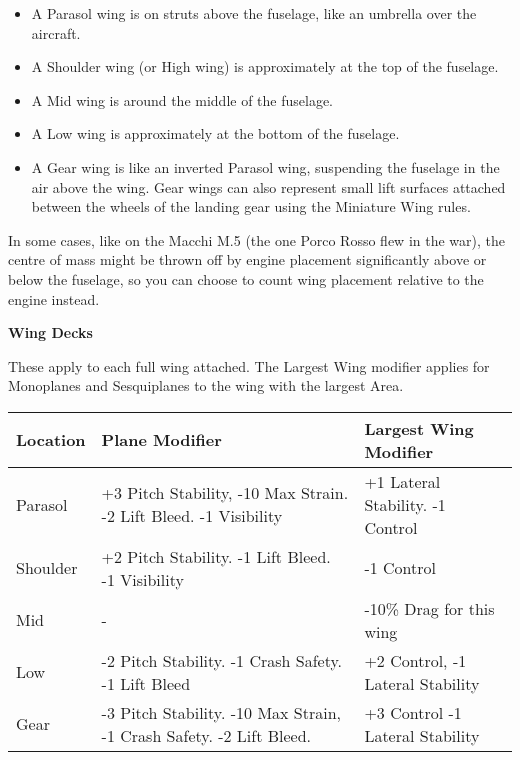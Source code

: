 \documentclass{article}
\begin{document}
\begin{itemize}
  \item          A Parasol wing is on struts above the fuselage, like an
        umbrella over the aircraft.
  \item          A Shoulder wing (or High wing) is approximately at the top of the
        fuselage.
  \item          A Mid wing is around the middle of the fuselage.
  \item          A Low wing is approximately at the bottom of the fuselage.
  \item          A Gear wing is like an inverted Parasol wing, suspending the
        fuselage in the air above the wing. Gear wings can also represent
        small lift surfaces attached between the wheels of the landing gear
        using the Miniature Wing rules.
\end{itemize}

In some cases, like on the Macchi M.5 (the one Porco Rosso flew in the
war), the centre of mass might be thrown off by engine placement
significantly above or below the fuselage, so you can choose to count
wing placement relative to the engine instead.

\textbf{Wing Decks}

These apply to each full wing attached. The Largest Wing modifier
applies for Monoplanes and Sesquiplanes to the wing with the largest
Area.

\begin{tabular}{|l|l|l|}
  \hline
  Location   & Plane Modifier                                               & Largest Wing Modifier    \\\hline
  Parasol    & +3 Pitch Stability, -10 Max Strain. -2 Lift Bleed. -1
  Visibility & +1 Lateral Stability. -1 Control                                                        \\\hline
  Shoulder   & +2 Pitch Stability. -1 Lift Bleed. -1 Visibility             & -1
  Control                                                                                              \\\hline
  Mid        & -                                                            & -10\% Drag for this wing \\\hline
  Low        & -2 Pitch Stability. -1 Crash Safety. -1 Lift Bleed           & +2 Control,
  -1 Lateral Stability                                                                                 \\\hline
  Gear       & -3 Pitch Stability. -10 Max Strain, -1 Crash Safety. -2 Lift
  Bleed.     & +3 Control -1 Lateral Stability                                                         \\\hline
\end{tabular}
\end{document}
